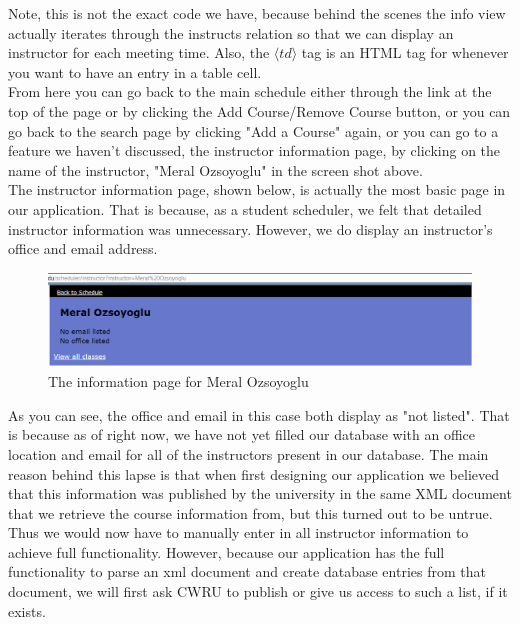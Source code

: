 \documentclass[pdftex,12pt,letter]{article}
\begin{document}
Note, this is not the exact code we have, because behind the scenes the info view actually iterates through the instructs relation so that we can display an instructor for each meeting time. Also, the $\langle td \rangle$ tag is an HTML tag for whenever you want to have an entry in a table cell.\\

From here you can go back to the main schedule either through the link at the top of the page or by clicking the Add Course/Remove Course button, or you can go back to the search page by clicking "Add a Course" again, or you can go to a feature we haven't discussed, the instructor information page, by clicking on the name of the instructor, "Meral Ozsoyoglu" in the screen shot above.\\

The instructor information page, shown below, is actually the most basic page in our application. That is because, as a student scheduler, we felt that detailed instructor information was unnecessary. However, we do display an instructor's office and email address.
\begin{figure}
\includegraphics[width=6in]{meral.png}
\caption{The information page for Meral Ozsoyoglu}
\end{figure}
\FloatBarrier
As you can see, the office and email in this case both display as "not listed". That is because as of right now, we have not yet filled our database with an office location and email for all of the instructors present in our database. The main reason behind this lapse is that when first designing our application we believed that this information was published by the university in the same XML document that we retrieve the course information from, but this turned out to be untrue. Thus we would now have to manually enter in all instructor information to achieve full functionality. However, because our application has the full functionality to parse an xml document and create database entries from that document, we will first ask CWRU to publish or give us access to such a list, if it exists.\\
\end{document}
